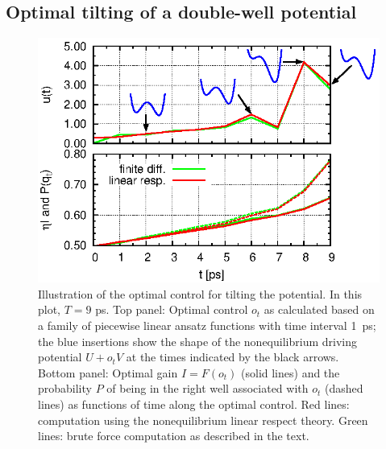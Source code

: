 \documentclass[]{tMPH2e}
\begin{document}
\subsection{Optimal tilting of a double-well potential}
\begin{figure}
  \centering
  \includegraphics[]{figs/fig-ctr-stat-2.eps}
  \caption{Illustration of the optimal control for tilting the potential.  
    In this plot, $T=9$ ps.  Top panel: Optimal control $o_t$ as calculated based on a family of piecewise linear ansatz functions with time interval 1~ps; the blue insertions show the shape of the nonequilibrium driving potential $U + o_t V$ at the times indicated by the black arrows. Bottom panel: Optimal gain $I=F(o_t)$ (solid lines) and the probability $P$ of being in the right well associated with $o_t$ (dashed lines) as functions of time along the optimal control. Red lines: computation using   the nonequilibrium linear respect theory. Green lines: brute force computation as described in the text. }\label{fig:tmp7}
\end{figure}
\end{document}
